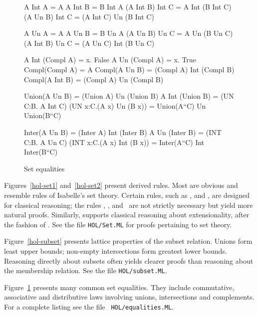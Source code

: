 \begin{figure} \underscoreon   \hfuzz=4pt%
\begin{ttbox}
        A Int A = A
       A Int B = B Int A
         (A Int B) Int C  =  A Int (B Int C)
    (A Un B)  Int C  =  (A Int C) Un (B Int C)

         A Un A = A
        A Un B = B Un A
          (A Un B)  Un C  =  A Un (B Un C)
    (A Int B) Un C  =  (A Un C) Int (B Un C)

    A Int (Compl A) = {\ttlbrace}x. False{\ttrbrace}
   A Un  (Compl A) = {\ttlbrace}x. True{\ttrbrace}
 Compl(Compl A) = A
          Compl(A Un B)  = (Compl A) Int (Compl B)
         Compl(A Int B) = (Compl A) Un (Compl B)

  Union(A Un B) = (Union A) Un (Union B)
         A Int (Union B) = (UN C:B. A Int C)
    (UN x:C.(A x) Un (B x)) = Union(A``C) Un Union(B``C)

  Inter(A Un B) = (Inter A) Int (Inter B)
          A Un (Inter B) = (INT C:B. A Un C)
   (INT x:C.(A x) Int (B x)) = Inter(A``C) Int Inter(B``C)
\end{ttbox}
\caption{Set equalities} \label{hol-equalities}
\end{figure}


Figures~\ref{hol-set1} and~\ref{hol-set2} present derived rules.  Most are
obvious and resemble rules of Isabelle's {\ZF} set theory.  Certain rules,
such as ,  and ,
are designed for classical reasoning; the rules ,
,  and~ are not
strictly necessary but yield more natural proofs.  Similarly,
 supports classical reasoning about extensionality,
after the fashion of .  See the file \texttt{HOL/Set.ML} for
proofs pertaining to set theory.

Figure~\ref{hol-subset} presents lattice properties of the subset relation.
Unions form least upper bounds; non-empty intersections form greatest lower
bounds.  Reasoning directly about subsets often yields clearer proofs than
reasoning about the membership relation.  See the file \texttt{HOL/subset.ML}.

Figure~\ref{hol-equalities} presents many common set equalities.  They
include commutative, associative and distributive laws involving unions,
intersections and complements.  For a complete listing see the file {\tt
HOL/equalities.ML}.

